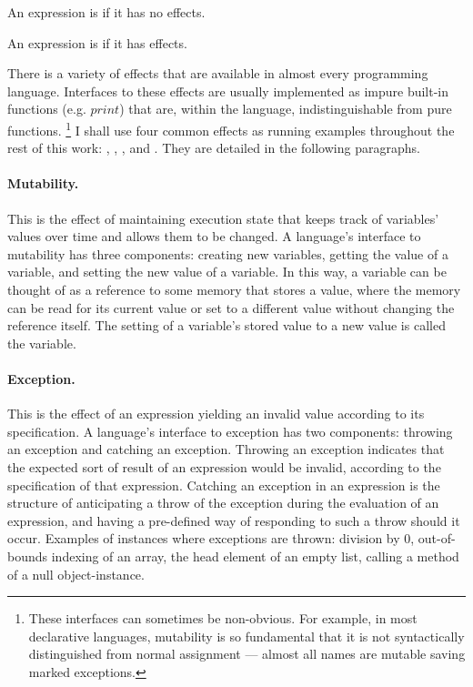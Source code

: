 \begin{blockdefinition}
  An expression is  if it has no effects.
\end{blockdefinition}

\begin{blockdefinition}
  An expression is  if it has effects.
\end{blockdefinition}

There is a variety of effects that are available in almost every programming language.
Interfaces to these effects are usually implemented as impure built-in functions (e.g. $print$) that are, within the language, indistinguishable from pure functions.%
\footnote{
  These interfaces can sometimes be non-obvious.
  For example, in most declarative languages, mutability is so fundamental that it is not syntactically distinguished from normal assignment --- almost all names are mutable saving marked exceptions.
}
I shall use four common effects as running examples throughout the rest of this work: , , , and .
They are detailed in the following paragraphs.

\paragraph{Mutability.}
This is the effect of maintaining execution state that keeps track of variables' values over time and allows them to be changed.
A language's interface to mutability has three components: creating new variables, getting the value of a variable, and setting the new value of a variable.
In this way, a variable can be thought of as a reference to some memory that stores a value, where the memory can be read for its current value or set to a different value without changing the reference itself.
The setting of a variable's stored value to a new value is called  the variable.

\paragraph{Exception.}
This is the effect of an expression yielding an invalid value according to its specification.
A language's interface to exception has two components: throwing an exception and catching an exception.
Throwing an exception indicates that the expected sort of result of an expression would be invalid, according to the specification of that expression.
Catching an exception in an expression is the structure of anticipating a throw of the exception during the evaluation of an expression, and having a pre-defined way of responding to such a throw should it occur.
Examples of instances where exceptions are thrown: division by $0$, out-of-bounds indexing of an array, the head element of an empty list, calling a method of a null object-instance.


